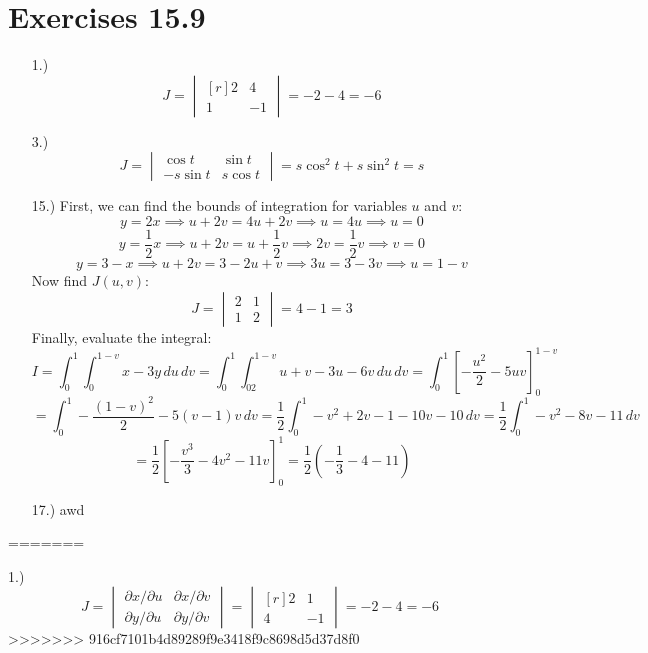 \documentclass[12pt]{article}
\newcommand{\pderv}[2]{{\partial#1}/{\partial#2}}
\newcommand{\bracks}[1]{\left[#1\right]}
\newcommand{\parns}[1]{\left(#1\right)}
\begin{document}
\section*{Exercises 15.9}
\begin{itemize}
<<<<<<< HEAD
    \item [1.)] \[J=\begin{vmatrix*}[r]
        2 & 4 \\
        1 & -1
    \end{vmatrix*}=-2-4=-6\]

    \item [3.)] \[J=\begin{vmatrix*}
        \cos t & \sin t \\
        -s\sin t & s\cos t
    \end{vmatrix*}=s\cos^2t+s\sin^2t=s\]

    \item [15.)] First, we can find the bounds of integration for variables $u$ and $v$:
    \[y=2x\implies u+2v=4u+2v\implies u=4u\implies u=0\]
    \[y=\frac{1}{2}x\implies u+2v=u+\frac{1}{2}v\implies 2v=\frac{1}{2}v\implies v=0\]
    \[y=3-x\implies u+2v=3-2u+v\implies 3u=3-3v\implies u=1-v\]
    Now find $J(u,v)$:
    \[J=\begin{vmatrix*}
        2 & 1 \\
        1 & 2
    \end{vmatrix*}=4-1=3\]
    Finally, evaluate the integral:
    \[I=\int^1_0\int^{1-v}_0x-3y\,du\,dv=\int^1_0\int^{1-v}_02u+v-3u-6v\,du\,dv=\int^1_0\bracks{-\frac{u^2}{2}-5uv}^{1-v}_0\]
    \[=\int^1_0-\frac{(1-v)^2}{2}-5(v-1)v\,dv=\frac{1}{2}\int^1_0-v^2+2v-1-10v-10\,dv=\frac{1}{2}\int^1_0-v^2-8v-11\,dv\]
    \[=\frac{1}{2}\bracks{-\frac{v^3}{3}-4v^2-11v}^1_0=\frac{1}{2}\parns{-\frac{1}{3}-4-11}\]

    \item [17.)] awd

\end{itemize}
=======
    \item [1.)] \[J=\begin{vmatrix}
        \pderv{x}{u} & \pderv{x}{v} \\
        \pderv{y}{u} & \pderv{y}{v}
    \end{vmatrix}=\begin{vmatrix*}[r]
        2 & 1 \\
        4 & -1
    \end{vmatrix*}=-2-4=-6\]
>>>>>>> 916cf7101b4d89289f9e3418f9c8698d5d37d8f0
\end{document}
